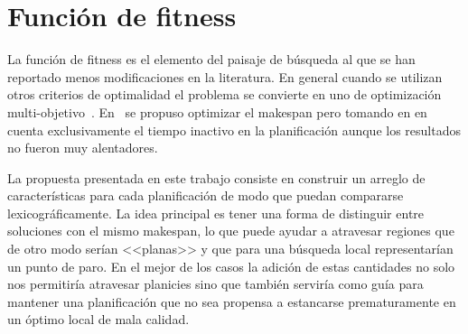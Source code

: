 \section{Función de fitness}\label{prop:fitness}
La función de fitness es el elemento del paisaje de búsqueda al que se han reportado menos modificaciones en la literatura. 
%
En general cuando se utilizan otros criterios de optimalidad el problema se convierte en uno de optimización 
multi-objetivo~\cite{gong2019effective,sakawa2000fuzzy,ponnambalam2001multiobjective}.
%
En~\cite{uckun1993managing} se propuso optimizar el makespan pero tomando en en cuenta exclusivamente el tiempo inactivo en la planificación 
aunque los resultados no fueron muy alentadores.   

La propuesta presentada en este trabajo consiste en construir un arreglo de características para cada planificación de modo que puedan 
compararse lexicográficamente. 
%
La idea principal es tener una forma de distinguir entre soluciones con el mismo makespan, lo que puede ayudar a atravesar regiones que de 
otro modo serían <<planas>> y que para una búsqueda local representarían un punto de paro. 
%
En el mejor de los casos la adición de estas cantidades no solo nos permitiría atravesar planicies sino que también serviría como guía para
mantener una planificación que no sea propensa a estancarse prematuramente en un óptimo local de mala calidad.


